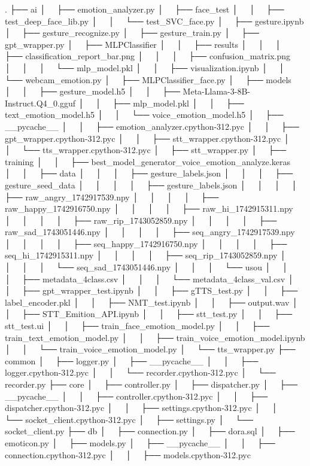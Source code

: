 .
├── ai
│   ├── emotion_analyzer.py
│   ├── face_test
│   │   ├── test_deep_face_lib.py
│   │   └── test_SVC_face.py
│   ├── gesture.ipynb
│   ├── gesture_recognize.py
│   ├── gesture_train.py
│   ├── gpt_wrapper.py
│   ├── MLPClassifier
│   │   ├── results
│   │   │   ├── classification_report_bar.png
│   │   │   ├── confusion_matrix.png
│   │   │   └── mlp_model.pkl
│   │   ├── visualization.ipynb
│   │   └── webcam_emotion.py
│   ├── MLPClassifier_face.py
│   ├── models
│   │   ├── gesture_model.h5
│   │   ├── Meta-Llama-3-8B-Instruct.Q4_0.gguf
│   │   ├── mlp_model.pkl
│   │   ├── text_emotion_model.h5
│   │   └── voice_emotion_model.h5
│   ├── __pycache__
│   │   ├── emotion_analyzer.cpython-312.pyc
│   │   ├── gpt_wrapper.cpython-312.pyc
│   │   ├── stt_wrapper.cpython-312.pyc
│   │   └── tts_wrapper.cpython-312.pyc
│   ├── stt_wrapper.py
│   ├── training
│   │   ├── best_model_generator_voice_emotion_analyze.keras
│   │   ├── data
│   │   │   ├── gesture_labels.json
│   │   │   ├── gesture_seed_data
│   │   │   │   ├── gesture_labels.json
│   │   │   │   ├── raw_angry_1742917539.npy
│   │   │   │   ├── raw_happy_1742916750.npy
│   │   │   │   ├── raw_hi_1742915311.npy
│   │   │   │   ├── raw_rip_1743052859.npy
│   │   │   │   ├── raw_sad_1743051446.npy
│   │   │   │   ├── seq_angry_1742917539.npy
│   │   │   │   ├── seq_happy_1742916750.npy
│   │   │   │   ├── seq_hi_1742915311.npy
│   │   │   │   ├── seq_rip_1743052859.npy
│   │   │   │   └── seq_sad_1743051446.npy
│   │   │   └── usou
│   │   │       ├── metadata_4class.csv
│   │   │       └── metadata_4class_val.csv
│   │   ├── gpt_wrapper_test.ipynb
│   │   ├── gTTS_test.py
│   │   ├── label_encoder.pkl
│   │   ├── NMT_test.ipynb
│   │   ├── output.wav
│   │   ├── STT_Emition_API.ipynb
│   │   ├── stt_test.py
│   │   ├── stt_test.ui
│   │   ├── train_face_emotion_model.py
│   │   ├── train_text_emotion_model.py
│   │   ├── train_voice_emotion_model.ipynb
│   │   └── train_voice_emotion_model.py
│   └── tts_wrapper.py
├── common
│   ├── logger.py
│   ├── __pycache__
│   │   ├── logger.cpython-312.pyc
│   │   └── recorder.cpython-312.pyc
│   └── recorder.py
├── core
│   ├── controller.py
│   ├── dispatcher.py
│   ├── __pycache__
│   │   ├── controller.cpython-312.pyc
│   │   ├── dispatcher.cpython-312.pyc
│   │   ├── settings.cpython-312.pyc
│   │   └── socket_client.cpython-312.pyc
│   ├── settings.py
│   └── socket_client.py
├── db
│   ├── connection.py
│   ├── dora.sql
│   ├── emoticon.py
│   ├── models.py
│   ├── __pycache__
│   │   ├── connection.cpython-312.pyc
│   │   ├── models.cpython-312.pyc
